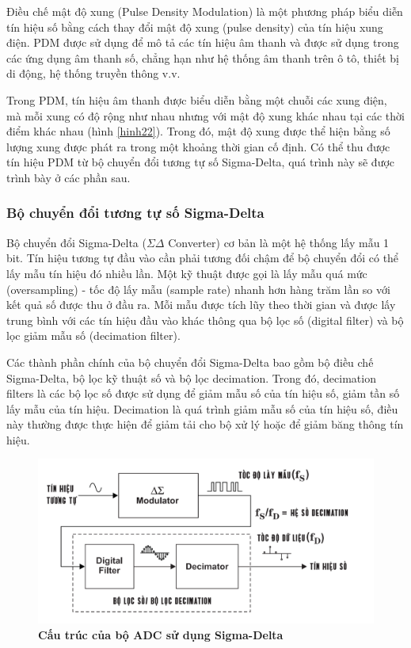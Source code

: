 Điều chế mật độ xung (Pulse Density Modulation) là một phương pháp biểu diễn tín hiệu số bằng cách thay đổi mật độ xung (pulse density) của tín hiệu xung điện. PDM được sử dụng để mô tả các tín hiệu âm thanh và được sử dụng trong các ứng dụng âm thanh số, chẳng hạn như hệ thống âm thanh trên ô tô, thiết bị di động, hệ thống truyền thông v.v.

Trong PDM, tín hiệu âm thanh được biểu diễn bằng một chuỗi các xung điện, mà mỗi xung có độ rộng như nhau nhưng với mật độ xung khác nhau tại các thời điểm khác nhau (hình \ref{hinh22}). Trong đó, mật độ xung được thể hiện bằng số lượng xung được phát ra trong một khoảng thời gian cố định. Có thể thu được tín hiệu PDM từ bộ chuyển đổi tương tự số Sigma-Delta, quá trình này sẽ được trình bày ở các phần sau.

\subsubsection{Bộ chuyển đổi tương tự số Sigma-Delta}
Bộ chuyển đổi Sigma-Delta ($\Sigma\Delta$ Converter) cơ bản là một hệ thống lấy mẫu 1 bit. Tín hiệu tương tự đầu vào cần phải tương đối chậm để bộ chuyển đổi có thể lấy mẫu tín hiệu đó nhiều lần. Một kỹ thuật được gọi là lấy mẫu quá mức (oversampling) - tốc độ lấy mẫu (sample rate) nhanh hơn hàng trăm lần so với kết quả số được thu ở đầu ra. Mỗi mẫu được tích lũy theo thời gian và được lấy trung bình với các tín hiệu đầu vào khác thông qua bộ lọc số (digital filter) và bộ lọc giảm mẫu số (decimation filter).\cite{8227915}

Các thành phần chính của bộ chuyển đổi Sigma-Delta bao gồm bộ điều chế Sigma-Delta, bộ lọc kỹ thuật số và bộ lọc decimation. Trong đó, decimation filters là các bộ lọc số được sử dụng để giảm mẫu số của tín hiệu số, giảm tần số lấy mẫu của tín hiệu. Decimation là quá trình giảm mẫu số của tín hiệu số, điều này thường được thực hiện để giảm tải cho bộ xử lý hoặc để giảm băng thông tín hiệu. 
\begin{figure}[!ht]
    \centering
    \includegraphics[width=12cm]{Images/Chuong2/DAC-SD.png}
    \caption[Cấu trúc của bộ ADC sử dụng Sigma-Delta]{\bfseries \fontsize{12pt}{0pt}\selectfont Cấu trúc của bộ ADC sử dụng Sigma-Delta}
    \label{hinh23}
\end{figure}

